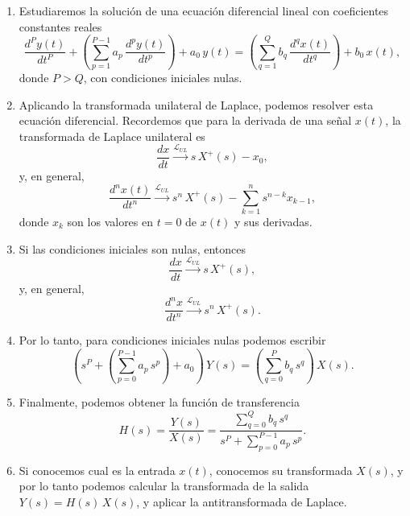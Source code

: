 \documentclass[11pt,a4paper,openany]{book}
\begin{document}
\begin{enumerate}
	\item Estudiaremos la soluci\'{o}n de una ecuaci\'{o}n diferencial lineal con coeficientes constantes reales
	\begin{equation}
		\frac{d^{P}y\left( t\right) }{dt^{P}} +
		\left(\sum_{p=1}^{P-1}a_{p} \, \frac{d^{p}y\left( t\right) }{dt^{p}}\right) + a_{0} \, y(t)= 
		\left(\sum_{q=1}^{Q}b_{q} \, \frac{d^{q}x\left( t\right) }{dt^{q}}\right)  + b_{0} \, x(t),
	\end{equation}
	donde $P > Q$, con condiciones iniciales nulas.
	
	\item Aplicando la transformada unilateral de Laplace, podemos resolver esta ecuaci\'{o}n diferencial. Recordemos que para la derivada de una se\~{n}al $x(t)$, la transformada de Laplace unilateral es
	\begin{equation}
		\frac{dx}{dt} \xrightarrow{\mathcal{L}_{UL}} s \, X^{+}(s) - x_{0},
	\end{equation}
	y, en general,
	\begin{equation}
		\frac{d^{n}x(t)}{dt^{n}} \xrightarrow{\mathcal{L}_{UL}}
		s^{n} \, X^{+}(s) - \sum_{k=1}^{n} s^{n-k} x_{k-1},
	\end{equation}
	donde $x_{k}$ son los valores en $t = 0$ de $x(t)$ y sus derivadas.
	
	\item Si las condiciones iniciales son nulas, entonces
	\begin{equation}
		\frac{dx}{dt} \xrightarrow{\mathcal{L}_{UL}} s \, X^{+}(s),
	\end{equation}
	y, en general,
	\begin{equation}
		\frac{d^{n}x}{dt^{n}} \xrightarrow{\mathcal{L}_{UL}}
		s^{n} \, X^{+}(s).
	\end{equation}
	
	\item Por lo tanto, para condiciones iniciales nulas podemos escribir
	\begin{equation}
		\left(s^{P} + 
		\left(\sum_{p=0}^{P-1} a_{p} \, s^{p}\right) + a_{0} \right) \, Y(s) = 
		\left(\sum_{q=0}^{P} b_{q} \, s^{q} \right) \, X(s).
	\end{equation}
	
	\item Finalmente, podemos obtener la función de transferencia
	\begin{equation}
		H(s) = \frac{Y(s)}{X(s)} = 
		\frac{\sum_{q=0}^{Q} b_{q} \, s^{q}}{s^{P} + \sum_{p=0}^{P-1} a_{p} \, s^{p}}.
	\end{equation}
	
	\item Si conocemos cual es la entrada $x(t)$, conocemos su transformada $X(s)$, y por lo tanto podemos calcular la transformada de la salida $Y(s) = H(s) \, X(s)$, y aplicar la antitransformada de Laplace.
\end{enumerate}
\end{document}
